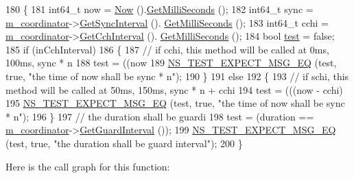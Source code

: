 \begin{DoxyCode}
180 \{
181   int64\_t now = \hyperlink{group__simulator_gac3635e2e87f7ce316c89290ee1b01d0d}{Now} ().\hyperlink{classns3_1_1Time_aba3428a8b6c4c8d9014ce44145081f34}{GetMilliSeconds} ();
182   int64\_t sync = \hyperlink{classChannelCoordinationTestCase_aa469b580039ced8be2fdd10720594cf2}{m\_coordinator}->\hyperlink{classns3_1_1ChannelCoordinator_a1e92e2033eb6f01d792dbb06808bff81}{GetSyncInterval} ().
      \hyperlink{classns3_1_1Time_aba3428a8b6c4c8d9014ce44145081f34}{GetMilliSeconds} ();
183   int64\_t cchi = \hyperlink{classChannelCoordinationTestCase_aa469b580039ced8be2fdd10720594cf2}{m\_coordinator}->\hyperlink{classns3_1_1ChannelCoordinator_a9716fda402d8768bf5488e7471c41eff}{GetCchInterval} ().
      \hyperlink{classns3_1_1Time_aba3428a8b6c4c8d9014ce44145081f34}{GetMilliSeconds} ();
184   \textcolor{keywordtype}{bool} \hyperlink{main-test-sync_8cc_a708a4c1a4d0c4acc4c447310dd4db27f}{test} = \textcolor{keyword}{false};
185   \textcolor{keywordflow}{if} (inCchInterval)
186     \{
187       \textcolor{comment}{// if cchi, this method will be called at 0ms, 100ms, sync * n}
188       test = ((now %
189       \hyperlink{group__testing_ga7304ba46a28d8cf08dfdfd6499cf7068}{NS\_TEST\_EXPECT\_MSG\_EQ} (test, \textcolor{keyword}{true}, \textcolor{stringliteral}{"the time of now shall be sync * n"});
190     \}
191   \textcolor{keywordflow}{else}
192     \{
193       \textcolor{comment}{// if schi, this method will be called at 50ms, 150ms, sync * n + cchi}
194       test = (((now - cchi) %
195       \hyperlink{group__testing_ga7304ba46a28d8cf08dfdfd6499cf7068}{NS\_TEST\_EXPECT\_MSG\_EQ} (test, \textcolor{keyword}{true}, \textcolor{stringliteral}{"the time of now shall be sync * n"});
196     \}
197   \textcolor{comment}{// the duration shall be guardi}
198   test = (duration == \hyperlink{classChannelCoordinationTestCase_aa469b580039ced8be2fdd10720594cf2}{m\_coordinator}->\hyperlink{classns3_1_1ChannelCoordinator_a818fcbf14bd42870849b245540acacdb}{GetGuardInterval} ());
199   \hyperlink{group__testing_ga7304ba46a28d8cf08dfdfd6499cf7068}{NS\_TEST\_EXPECT\_MSG\_EQ} (test, \textcolor{keyword}{true}, \textcolor{stringliteral}{"the duration shall be guard interval"});
200 \}
\end{DoxyCode}


Here is the call graph for this function\+:


